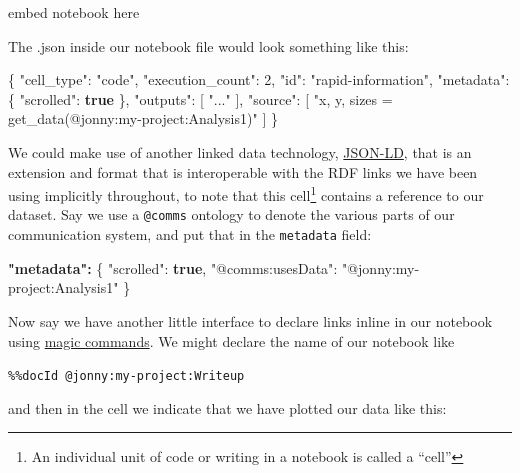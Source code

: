 \documentclass[10pt]{article}
\newenvironment{Shaded}{}{}
\newcommand{\DataTypeTok}[1]{\textcolor[rgb]{0.56,0.13,0.00}{#1}}
\newcommand{\DecValTok}[1]{\textcolor[rgb]{0.25,0.63,0.44}{#1}}
\newcommand{\ErrorTok}[1]{\textcolor[rgb]{1.00,0.00,0.00}{\textbf{#1}}}
\newcommand{\FunctionTok}[1]{\textcolor[rgb]{0.02,0.16,0.49}{#1}}
\newcommand{\KeywordTok}[1]{\textcolor[rgb]{0.00,0.44,0.13}{\textbf{#1}}}
\newcommand{\OtherTok}[1]{\textcolor[rgb]{0.00,0.44,0.13}{#1}}
\newcommand{\StringTok}[1]{\textcolor[rgb]{0.25,0.44,0.63}{#1}}
\begin{document}
\begin{multicols}{2}
embed notebook here

The .json inside our notebook file would look something like this:

\begin{Shaded}
\begin{Highlighting}[]
\FunctionTok{\{}
   \DataTypeTok{"cell\_type"}\FunctionTok{:} \StringTok{"code"}\FunctionTok{,}
   \DataTypeTok{"execution\_count"}\FunctionTok{:} \DecValTok{2}\FunctionTok{,}
   \DataTypeTok{"id"}\FunctionTok{:} \StringTok{"rapid{-}information"}\FunctionTok{,}
   \DataTypeTok{"metadata"}\FunctionTok{:} \FunctionTok{\{}
    \DataTypeTok{"scrolled"}\FunctionTok{:} \KeywordTok{true}
   \FunctionTok{\},}
   \DataTypeTok{"outputs"}\FunctionTok{:} \OtherTok{[}
    \StringTok{"..."}
   \OtherTok{]}\FunctionTok{,}
   \DataTypeTok{"source"}\FunctionTok{:} \OtherTok{[}
    \StringTok{"x, y, sizes = get\_data(\textquotesingle{}@jonny:my{-}project:Analysis1\textquotesingle{})"}
   \OtherTok{]}
\FunctionTok{\}}
\end{Highlighting}
\end{Shaded}

We could make use of another linked data technology,
\href{https://json-ld.org/}{JSON-LD}, that is an extension and format
that is interoperable with the RDF links we have been using implicitly
throughout, to note that this cell\footnote{An individual unit of code
  or writing in a notebook is called a ``cell''} contains a reference to
our dataset. Say we use a \texttt{@comms} ontology to denote the various
parts of our communication system, and put that in the \texttt{metadata}
field:

\begin{Shaded}
\begin{Highlighting}[]
\ErrorTok{"metadata":} \FunctionTok{\{}
  \DataTypeTok{"scrolled"}\FunctionTok{:} \KeywordTok{true}\FunctionTok{,}
  \DataTypeTok{"@comms:usesData"}\FunctionTok{:} \StringTok{"@jonny:my{-}project:Analysis1"}
\FunctionTok{\}}
\end{Highlighting}
\end{Shaded}

Now say we have another little interface to declare links inline in our
notebook using
\href{https://ipython.readthedocs.io/en/stable/interactive/magics.html}{magic
commands}. We might declare the name of our notebook like

\texttt{\%\%docId\ @jonny:my-project:Writeup}

and then in the cell we indicate that we have plotted our data like
this:


\end{multicols}
\end{document}
